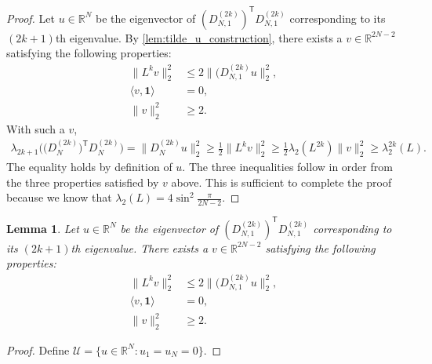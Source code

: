\documentclass[ejs,noshowframe]{imsart}
\theoremstyle{plain}
\newtheorem{lemma}[theorem]{Lemma}
\theoremstyle{definition}
\newcommand{\R}{\mathbb{R}}
\newcommand{\cU}{\mathcal{U}}
\newcommand{\one}{\mathbf{1}}
\renewcommand{\top}{\mathsf{T}}
\begin{document}
\begin{appendix}
\begin{proof}
	Let $u \in \R^N$ be the eigenvector of $(D^{(2k)}_{N,1})^\top  
	D^{(2k)}_{N,1}$ 
	corresponding to its $(2k+1)$th eigenvalue. By 
	\autoref{lem:tilde_u_construction}, there 
	exists a $v \in \R^{2N-2}$ 
	satisfying the following properties:
	\begin{align}
		\| L^{k} v \|_2^2 &\leq 2 \| (D^{(2k)}_{N,1} u \|_2^2,\\
		\langle v, \one \rangle &= 0,\\
		\| v \|_2^2 &\geq 2.
	\end{align}
	With such a $v$,
	\begin{align*}
		\lambda_{2k+1} \big( \big(D^{(2k)}_N \big)^\top D^{(2k)}_N \big) 
		= 
		\| D^{(2k)}_N u \|_2^2 
		\ge 
		\frac{1}{2} \| L^{k} v \|_2^2 
		\ge 
		\frac{1}{2} \lambda_2( L^{2k}) \| v \|_2^2 
		\ge 
		\lambda_2^{2k}(L).
	\end{align*}
	The equality holds by definition of $u$. The three inequalities follow in 
	order from the three properties satisfied by $v$ above.
	This is sufficient to complete the proof because we know that $\lambda_2(L) = 
	4 \sin^2 \frac{\pi}{2N-2}$.
\end{proof}

\begin{lemma}
	\label{lem:tilde_u_construction}
	Let $u \in \R^N$ be the eigenvector of $(D^{(2k)}_{N,1})^\top  
	D^{(2k)}_{N,1}$ 
	corresponding to its $(2k+1)$th eigenvalue. There exists a $v \in 	
	\R^{2N-2}$ 	satisfying the following properties:
	\begin{align}
	\| L^{k} v \|_2^2 &\leq 2 \| (D^{(2k)}_{N,1} u \|_2^2,\\
	\langle v, \one \rangle &= 0,\\
	\| v \|_2^2 &\geq 2.
\end{align}
\end{lemma}
\begin{proof}
	Define $\cU = \{ u \in \R^N : u_1 = u_N = 0\}$.


\end{proof}
\end{appendix}
\end{document}
